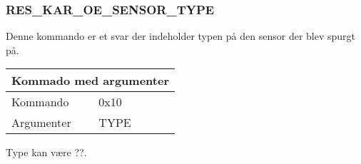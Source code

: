 \subsubsection{RES\_KAR\_OE\_SENSOR\_TYPE}
Denne kommando er et svar der indeholder typen på den sensor der blev spurgt på.

\begin{table}[H]
\setlength{\parindent}{12pt}
\begin{tabular}{|l|lcc|}
\hline
\multicolumn{4}{|c|}{Kommado med argumenter}\\\hline
Kommando & 0x10 & & \\
Argumenter & TYPE & & \\\hline
\end{tabular}
\end{table}

Type kan være ??.